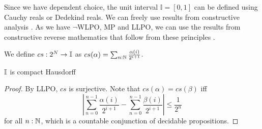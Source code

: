 Since we have dependent choice, the unit interval $\mathbb I = [0,1]$ can be defined using 
Cauchy reals or Dedekind reals. 
We can freely use results from constructive analysis \cite{Bishop}. 
As we have $\neg$WLPO, MP and LLPO, we can use the results from 
constructive reverse mathematics that follow from these principles \cite{ReverseMathsBishop, HannesDiener}. 
\begin{definition}
  We define $cs:2^N \to \mathbb{I}$ as 
  $cs(\alpha) = \sum_{n:\mathbb{N}} \frac{\alpha(i)}{2^{i+1}}$. 
\end{definition}

\begin{theorem}
  $\mathbb{I}$ is compact Hausdorff
\end{theorem}
\begin{proof}
  By LLPO, $cs$ is surjective.   
  Note that $cs(\alpha) = cs(\beta)$ iff 
  $$|\sum_{n=0}^{n-1} \frac{\alpha(i)}{2^{i+1}}-
  \sum_{n=0}^{n-1} \frac{\beta(i)}{2^{i+1}}|\leq \frac{1}{2^n}$$
  for all $n:\mathbb{N}$, which is a countable conjunction of decidable propositions.
\end{proof}

